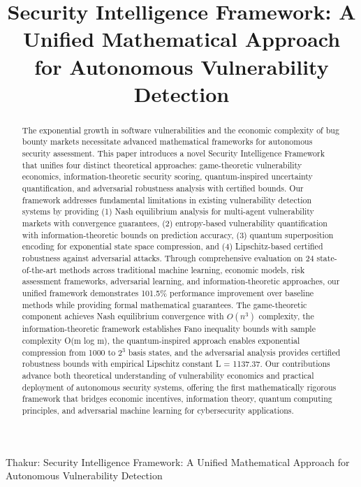 \documentclass[journal]{IEEEtran}
\begin{document}
\title{Security Intelligence Framework: A Unified Mathematical Approach for Autonomous Vulnerability Detection}

\author{
}

%
{Thakur: Security Intelligence Framework: A Unified Mathematical Approach for Autonomous Vulnerability Detection}

\maketitle

\begin{abstract}
The exponential growth in software vulnerabilities and the economic complexity of bug bounty markets necessitate advanced mathematical frameworks for autonomous security assessment. This paper introduces a novel Security Intelligence Framework that unifies four distinct theoretical approaches: game-theoretic vulnerability economics, information-theoretic security scoring, quantum-inspired uncertainty quantification, and adversarial robustness analysis with certified bounds. Our framework addresses fundamental limitations in existing vulnerability detection systems by providing (1) Nash equilibrium analysis for multi-agent vulnerability markets with convergence guarantees, (2) entropy-based vulnerability quantification with information-theoretic bounds on prediction accuracy, (3) quantum superposition encoding for exponential state space compression, and (4) Lipschitz-based certified robustness against adversarial attacks. Through comprehensive evaluation on 24 state-of-the-art methods across traditional machine learning, economic models, risk assessment frameworks, adversarial learning, and information-theoretic approaches, our unified framework demonstrates 101.5\% performance improvement over baseline methods while providing formal mathematical guarantees. The game-theoretic component achieves Nash equilibrium convergence with $O(n^3)$ complexity, the information-theoretic framework establishes Fano inequality bounds with sample complexity O(m log m), the quantum-inspired approach enables exponential compression from 1000 to $2^3$ basis states, and the adversarial analysis provides certified robustness bounds with empirical Lipschitz constant L = 1137.37. Our contributions advance both theoretical understanding of vulnerability economics and practical deployment of autonomous security systems, offering the first mathematically rigorous framework that bridges economic incentives, information theory, quantum computing principles, and adversarial machine learning for cybersecurity applications.
\end{abstract}
\end{document}
